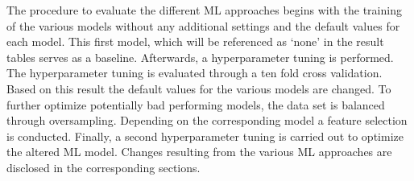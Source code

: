 The procedure to evaluate the different ML approaches begins with the training of the various models without any additional settings and the default values for each model. This first model, which will be referenced as \enquote*{none} in the result tables serves as a baseline. Afterwards, a hyperparameter tuning is performed. The hyperparameter tuning is evaluated through a ten fold cross validation. Based on this result the default values for the various models are changed. To further optimize potentially bad performing models, the data set is balanced through oversampling. Depending on the corresponding model a feature selection is conducted. Finally, a second hyperparameter tuning is carried out to optimize the altered ML model. Changes resulting from the various ML approaches are disclosed in the corresponding sections.


